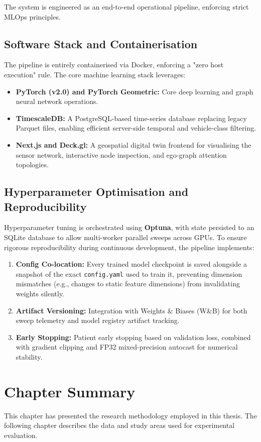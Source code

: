 The system is engineered as an end-to-end operational pipeline, enforcing strict MLOps principles. 

\subsection{Software Stack and Containerisation}
\label{subsec:meth-software}

The pipeline is entirely containerised via Docker, enforcing a "zero host execution" rule. The core machine learning stack leverages:
\begin{itemize}
    \item \textbf{PyTorch (v2.0) and PyTorch Geometric:} Core deep learning and graph neural network operations.
    \item \textbf{TimescaleDB:} A PostgreSQL-based time-series database replacing legacy Parquet files, enabling efficient server-side temporal and vehicle-class filtering.
    \item \textbf{Next.js and Deck.gl:} A geospatial digital twin frontend for visualising the sensor network, interactive node inspection, and ego-graph attention topologies.
\end{itemize}

\subsection{Hyperparameter Optimisation and Reproducibility}
\label{subsec:meth-reproducibility}

Hyperparameter tuning is orchestrated using \textbf{Optuna}, with state persisted to an SQLite database to allow multi-worker parallel sweeps across GPUs. To ensure rigorous reproducibility during continuous development, the pipeline implements:

\begin{enumerate}
    \item \textbf{Config Co-location:} Every trained model checkpoint is saved alongside a snapshot of the exact \texttt{config.yaml} used to train it, preventing dimension mismatches (e.g., changes to static feature dimensions) from invalidating weights silently.
    \item \textbf{Artifact Versioning:} Integration with Weights \& Biases (W\&B) for both sweep telemetry and model registry artifact tracking.
    \item \textbf{Early Stopping:} Patient early stopping based on validation loss, combined with gradient clipping and FP32 mixed-precision autocast for numerical stability.
\end{enumerate}

\section{Chapter Summary}
\label{sec:meth-summary}

This chapter has presented the research methodology employed in this thesis. The following chapter describes the data and study areas used for experimental evaluation.
